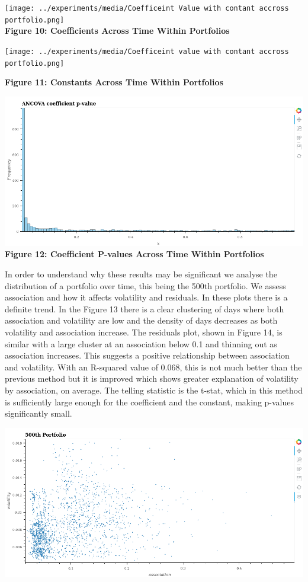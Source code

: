 \documentclass[11pt]{article}
\makeatletter
\def\maxwidth{\ifdim\Gin@nat@width>\linewidth\linewidth
    \else\Gin@nat@width\fi}
\let\Oldincludegraphics\includegraphics
\renewcommand{\includegraphics}[1]{\Oldincludegraphics[width=.8\maxwidth]{#1}}
\makeatother
\begin{document}
\texttt{[image: ../experiments/media/Coefficeint Value with contant accross portfolio.png]}\\

\textbf{Figure 10: Coefficients Across Time Within Portfolios}

\texttt{[image: ../experiments/media/Coefficeint value with contant accross portfolio.png]}

\textbf{Figure 11: Constants Across Time Within Portfolios}

\includegraphics{../experiments/media/Coefficeint P-value with contant accross portfolio.png}\\

\textbf{Figure 12: Coefficient P-values Across Time Within Portfolios}

In order to understand why these results may be significant we analyse
the distribution of a portfolio over time, this being the 500th
portfolio. We assess association and how it affects volatility and
residuals. In these plots there is a definite trend. In the Figure 13
there is a clear clustering of days where both association and
volatility are low and the density of days decreases as both volatility
and association increase. The residuals plot, shown in Figure 14, is
similar with a large cluster at an association below 0.1 and thinning
out as association increases. This suggests a positive relationship
between association and volatility. With an R-squared value of 0.068,
this is not much better than the previous method but it is improved
which shows greater explanation of volatility by association, on
average. The telling statistic is the t-stat, which in this method is
sufficiently large enough for the coefficient and the constant, making
p-values significantly small.

\includegraphics{../experiments/media/Scatter Plot of 500th Portofolio.png}\\
\end{document}
